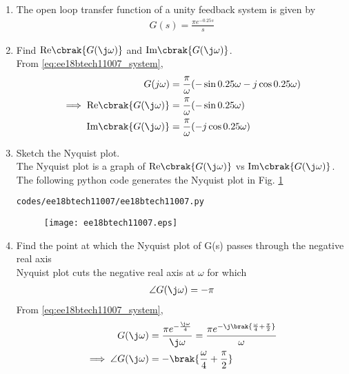 \begin{enumerate}[label=\thesubsection.\arabic*.,ref=\thesubsection.\theenumi]
\item The open loop transfer function of a unity feedback system is given by
\begin{align}
\label{eq:ee18btech11007_system}
 G(s)=\frac{\pi e^{-0.25s}}{s}
\end{align}
\item Find $\text{Re} \cbrak{G(\j \omega)}$ and $\text{Im} \cbrak{G(\j \omega)}$.
\\
\solution From \eqref{eq:ee18btech11007_system},
%
\begin{align}
G(j\omega)&=\frac{\pi}{\omega}(-\sin{0.25\omega}-j\cos{0.25\omega})
\\
\implies  \text{Re} \cbrak{G(\j \omega)}&=\frac{\pi}{\omega}(-\sin{0.25\omega}) 
\\
 \text{Im} \cbrak{G(\j \omega)}&=\frac{\pi}{\omega}(-j\cos{0.25\omega}) 
\end{align}
%
\item Sketch the Nyquist plot.
\\
\solution The Nyquist plot is a graph of $\text{Re} \cbrak{G(\j \omega)}$  vs $\text{Im} \cbrak{G(\j \omega)}$.
The following python code generates the Nyquist plot in Fig.  \ref{fig:ee18btech11007}
\begin{lstlisting}
codes/ee18btech11007/ee18btech11007.py
\end{lstlisting}
%
\begin{figure}[!h]
  \texttt{[image: ee18btech11007.eps]}
  \caption{}
  \label{fig:ee18btech11007}
\end{figure}
%
\item Find the point at which the Nyquist plot of G(s) passes through the negative real axis
\\
\solution  Nyquist plot cuts the negative real axis at $\omega $ for which 
\begin{align}
\angle G(\j\omega)=-\pi
\label{eq:ee18btech11007_system_neg_real}
\end{align}
From \eqref{eq:ee18btech11007_system},
\begin{align}
 G(\j\omega)&=\frac{\pi e^{-\frac{\j\omega}{4}}}{\j\omega} = \frac{\pi e^{-\j\brak{\frac{\omega}{4}+\frac{\pi}{2}}}}{\omega}
\\
\implies \angle{ G(\j\omega)} &= -\brak{\frac{\omega}{4}+\frac{\pi}{2}}
\label{eq:ee18btech11007_system_ang}
\end{align}

\end{enumerate}
